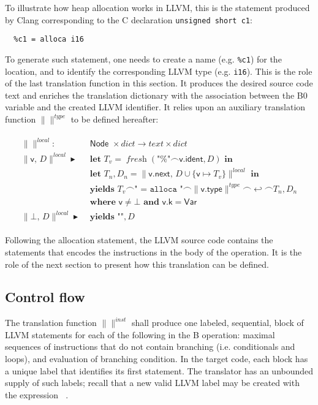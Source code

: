 \documentclass{article}
\newcommand{\trad}[2]{\ensuremath{\lVert \textsf{#1} \rVert^{\textit{#2}}}}
\newcommand{\nl}[0]{\ensuremath{\hookleftarrow}}
\newcommand{\mty}[0]{\texttt{""}}
\DeclareMathOperator{\conc}{\smallfrown}
\DeclareMathOperator{\isdef}{\blacktriangleright}
\DeclareMathOperator{\fresh}{\textit{fresh}}
\DeclareMathOperator{\name}{\mathcal{L}()}
\begin{document}
To illustrate how heap allocation works in LLVM, this is the statement
produced by Clang corresponding to the C declaration
\verb^unsigned short c1^:
\begin{verbatim}
  %c1 = alloca i16
\end{verbatim}
To generate such statement, one needs to create a name
(e.g. \texttt{\%c1}) for the location, and to identify the
corresponding LLVM type (e.g. \texttt{i16}). This is the role of the
last translation function in this section. It produces the desired
source code text and enriches the translation dictionary with the
association between the B0 variable and the created LLVM identifier. It
relies upon an auxiliary translation function $\trad{}{type}$ to be
defined hereafter:
\begin{framed}
\begin{align}
\begin{split}
  \trad{}{local} : & \textsf{ Node } \times dict \rightarrow text \times dict \\
  \trad{v, $D$}{local} \isdef & 
  \textbf{ let } T_v = \fresh(\texttt{"\%"}\conc\textsf{v.ident}, D) \textbf{ in}  \\
  & \textbf{ let } T_n, D_n = \trad{v.next, $D \cup \{ \textsf{v} \mapsto T_v \}$}{local} \textbf{ in}  \\
  & \textbf{ yields } T_v \conc \texttt{" = alloca "} \conc \trad{v.type}{type} \conc \nl \conc T_n, D_n  \\
  & \textbf{ where } \textsf{v} \ne \bot \textbf{ and } \textsf{v.k} = \textsf{Var}  \\
  \trad{$\bot$, $D$}{local} \isdef & 
  \textbf{ yields } \mty, D 
\end{split}
\end{align}
\end{framed}

Following the allocation statement, the LLVM source code contains the
statements that encodes the instructions in the body of the
operation. It is the role of the next section to present how this
translation can be defined.

\subsection{Control flow}
\label{sec:trad-instr}

The translation function $\trad{}{inst}$ shall produce one labeled,
sequential, block of LLVM statements for each of the following in the
B operation: maximal sequences of instructions that do not contain
branching (i.e. conditionals and loops), and evaluation of branching
condition. In the target code, each block has a unique label that
identifies its first statement. The translator has an unbounded supply
of such labels; recall that a new valid LLVM label may be created with
the expression $\name$.
\end{document}
